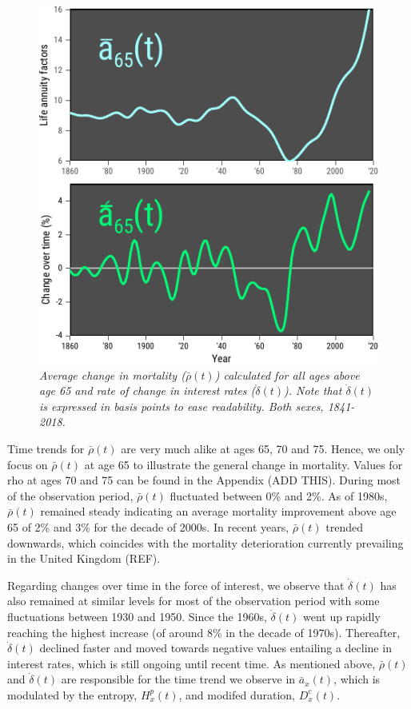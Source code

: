 \documentclass[12pt]{article}
\begin{document}
\begin{figure}[!ht]
	\centering
	\includegraphics[width=1\textwidth]{Fig/Fig2}
	\caption{\textit{Average change in mortality ($\bar{\rho}(t)$) calculated for all ages above age 65 and rate of change in interest rates ($\dot{\delta}(t)$). Note that $\dot{\delta}(t)$ is expressed in basis points to ease readability. Both sexes, 1841-2018.}}
	\label{fig:Fig2}
\end{figure}


Time trends for $\bar{\rho}(t)$ are very much alike at ages 65, 70 and 75. Hence, we only focus on $\bar{\rho}(t)$ at age 65 to illustrate the general change in mortality. Values for rho at ages 70 and 75 can be found in the Appendix (ADD THIS). During most of the observation period, $\bar{\rho}(t)$ fluctuated between 0\% and 2\%. As of 1980s, $\bar{\rho}(t)$ remained steady indicating an average mortality improvement above age 65 of 2\% and 3\% for the decade of 2000s. In recent years, $\bar{\rho}(t)$ trended downwards, which coincides with the mortality deterioration currently prevailing in the United Kingdom (REF). 

Regarding changes over time in the force of interest, we observe that $\dot{\delta}(t)$ has also remained at similar levels for most of the observation period with some fluctuations between 1930 and 1950. Since the 1960s, $\dot{\delta}(t)$ went up rapidly reaching the highest increase (of around 8\% in the decade of 1970s). Thereafter, $\dot{\delta}(t)$ declined faster and moved towards negative values entailing a decline in interest rates, which is still ongoing until recent time. As mentioned above, $\bar{\rho}(t)$ and $\dot{\delta}(t)$ are responsible for the time trend we observe in $\bar{a}_x(t)$, which is modulated by the entropy, ${H}^{p}_x(t)$, and modifed duration, ${D}^{c}_x(t)$.
\end{document}
